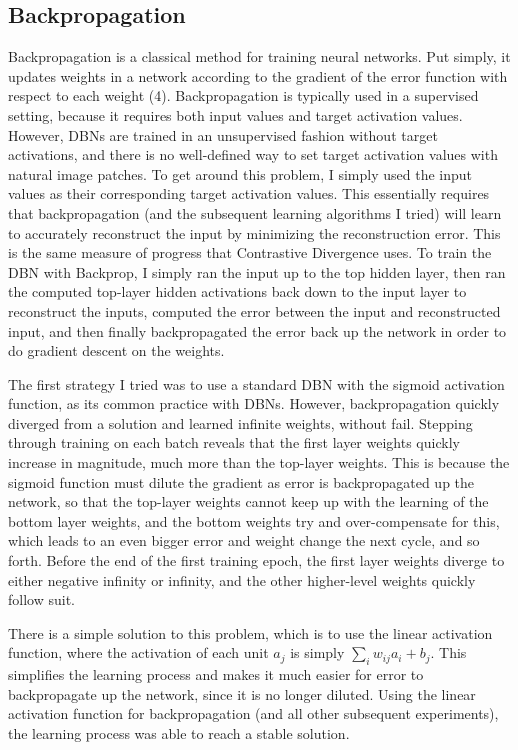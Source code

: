 \documentclass{article} %
\begin{document}
\subsection{Backpropagation}

Backpropagation is a classical method for training neural networks. Put simply, it updates weights in a network according to the gradient of the error function with respect to each weight (4). Backpropagation is typically used in a supervised setting, because it requires both input values and target activation values. 
However, DBNs are trained in an unsupervised fashion without target activations, and there is no well-defined way to set target activation values with natural image patches. To get around this problem, I simply used the input values as their corresponding target activation values. This essentially requires that backpropagation (and the subsequent learning algorithms I tried) will learn to accurately reconstruct the input by minimizing the reconstruction error. This is the same measure of progress that Contrastive Divergence uses. To train the DBN with Backprop, I simply ran the input up to the top hidden layer, then ran the computed top-layer hidden activations back down to the input layer to reconstruct the inputs, computed the error between the input and reconstructed input, and then finally backpropagated the error back up the network in order to do gradient descent on the weights.

The first strategy I tried was to use a standard DBN with the sigmoid activation function, as its common practice with DBNs. 
However, backpropagation quickly diverged from a solution and learned infinite weights, without fail. Stepping through training on each batch reveals that the first layer weights quickly increase in magnitude, much more than the top-layer weights. This is because the sigmoid function must dilute the gradient as error is backpropagated up the network, so that the top-layer weights cannot keep up with the learning of the bottom layer weights, and the bottom weights try and over-compensate for this, which leads to an even bigger error and weight change the next cycle, and so forth. Before the end of the first training epoch, the first layer weights diverge to either negative infinity or infinity, and the other higher-level weights quickly follow suit. 

There is a simple solution to this problem, which is to use the linear activation function, where the activation of each unit $a_j$ is simply $\sum_i w_{ij}a_i + b_j$. This simplifies the learning process and makes it much easier for error to backpropagate up the network, since it is no longer diluted. Using the linear activation function for backpropagation (and all other subsequent experiments), the learning process was able to reach a stable solution.
\end{document}
